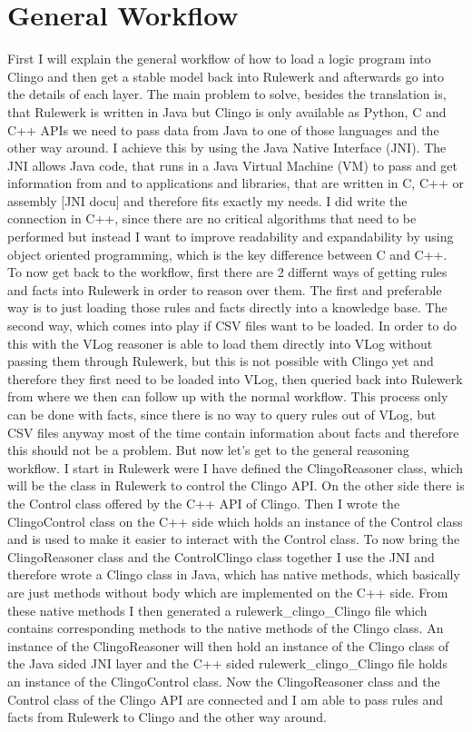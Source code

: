\documentclass[hyperref, bachelorofscience]{cgvpub}
\begin{document}
\section{General Workflow}
First I will explain the general workflow of how to load a logic program into Clingo and then get a stable model back into Rulewerk and afterwards go into the details of each layer. The main problem to solve, besides the translation is, that Rulewerk is written in Java but Clingo is only available as Python, C and C++ APIs we need to pass data from Java to one of those languages and the other way around. I achieve this by using the Java Native Interface (JNI). The JNI allows Java code, that runs in a Java Virtual Machine (VM) to pass and get information from and to applications and libraries, that are written in C, C++ or assembly [JNI docu] and therefore fits exactly my needs. I did write the connection in C++, since there are no critical algorithms that need to be performed but instead I want to improve readability and expandability by using object oriented programming, which is the key difference between C and C++. \\
To now get back to the workflow, first there are 2 differnt ways of getting rules and facts into Rulewerk in order to reason over them. The first and preferable way is to just loading those rules and facts directly into a knowledge base. The second way, which comes into play if CSV files want to be loaded. In order to do this with the VLog reasoner is able to load them directly into VLog without passing them through Rulewerk, but this is not possible with Clingo yet and therefore they first need to be loaded into VLog, then queried back into Rulewerk from where we then can follow up with the normal workflow. This process only can be done with facts, since there is no way to query rules out of VLog, but CSV files anyway most of the time contain information about facts and therefore this should not be a problem. But now let's get to the general reasoning workflow. I start in Rulewerk were I have defined the ClingoReasoner class, which will be the class in Rulewerk to control the Clingo API. On the other side there is the Control class offered by the C++ API of Clingo. Then I wrote the ClingoControl class on the C++ side which holds an instance of the Control class and is used to make it easier to interact with the Control class. To now bring the ClingoReasoner class and the ControlClingo class together I use the JNI and therefore wrote a Clingo class in Java, which has native methods, which basically are just methods without body which are implemented on the C++ side. From these native methods I then generated a rulewerk\string_clingo\string_Clingo file which contains corresponding methods to the native methods of the Clingo class. An instance of the ClingoReasoner will then hold an instance of the Clingo class of the Java sided JNI layer and the C++ sided rulewerk\string_clingo\string_Clingo file holds an instance of the ClingoControl class. Now the ClingoReasoner class and the Control class of the Clingo API are connected and I am able to pass rules and facts from Rulewerk to Clingo and the other way around.\\
\end{document}

